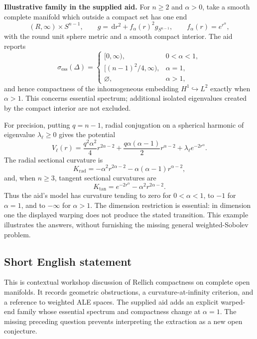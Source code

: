 \documentclass[11pt]{article}
\newcommand{\dd}{\,\mathrm{d}}
\begin{document}
\textbf{Illustrative family in the supplied aid.} For \(n\ge2\) and \(\alpha>0\), take a smooth complete manifold which outside a compact set has one end
\[
 (R,\infty)\times S^{n-1},\qquad
 g=\dd r^2+f_\alpha(r)^2g_{S^{n-1}},\qquad f_\alpha(r)=e^{r^\alpha},
\]
with the round unit sphere metric and a smooth compact interior. The aid reports
\[
 \sigma_{\mathrm{ess}}(\Delta)=
 \begin{cases}
 [0,\infty),&0<\alpha<1,\\
 [(n-1)^2/4,\infty),&\alpha=1,\\
 \varnothing,&\alpha>1,
 \end{cases}
\]
and hence compactness of the inhomogeneous embedding \(H^1\hookrightarrow L^2\) exactly when \(\alpha>1\). This concerns essential spectrum; additional isolated eigenvalues created by the compact interior are not excluded.

For precision, putting \(q=n-1\), radial conjugation on a spherical harmonic of eigenvalue \(\lambda_\ell\ge0\) gives the potential
\[
 V_\ell(r)=\frac{q^2\alpha^2}{4}r^{2\alpha-2}
 +\frac{q\alpha(\alpha-1)}2r^{\alpha-2}
 +\lambda_\ell e^{-2r^\alpha}.
\]
The radial sectional curvature is
\[
 K_{\mathrm{rad}}=-\alpha^2r^{2\alpha-2}
                  -\alpha(\alpha-1)r^{\alpha-2},
\]
and, when \(n\ge3\), tangent sectional curvatures are
\[
 K_{\mathrm{tan}}=e^{-2r^\alpha}-\alpha^2r^{2\alpha-2}.
\]
Thus the aid's model has curvature tending to zero for \(0<\alpha<1\), to \(-1\) for \(\alpha=1\), and to \(-\infty\) for \(\alpha>1\). The dimension restriction is essential: in dimension one the displayed warping does not produce the stated transition. This example illustrates the answers, without furnishing the missing general weighted-Sobolev problem.
\subsection{Short English statement}
This is contextual workshop discussion of Rellich compactness on complete open manifolds. It records geometric obstructions, a curvature-at-infinity criterion, and a reference to weighted ALE spaces. The supplied aid adds an explicit warped-end family whose essential spectrum and compactness change at \(\alpha=1\). The missing preceding question prevents interpreting the extraction as a new open conjecture.
\end{document}
